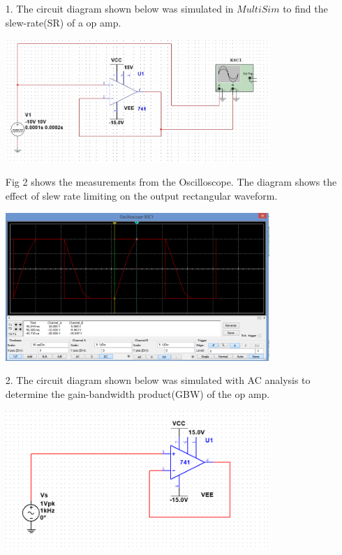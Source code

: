 \documentclass[11pt,a4paper]{article}
\begin{document}
\begin{enumerate}
  \item[1.]
  The circuit diagram shown below was simulated in $MultiSim$ to find the slew-rate(SR) of a op amp.\\
    \begin{minipage}{\linewidth}
      \centering       
       \includegraphics[width=10cm]{Task1-1Circuit}\\
    \end{minipage}
    
Fig 2 shows the measurements from the Oscilloscope. The diagram shows the effect of slew rate limiting on the output rectangular waveform.\\
    \begin{minipage}{\linewidth}
      \centering       
       \includegraphics[width=10cm]{Task1-1-Oscilloscope}\\
    \end{minipage}
  
  \item[2.]
  The circuit diagram shown below was simulated with AC analysis to determine the gain-bandwidth product(GBW) of the op amp.  
  
      \begin{minipage}{\linewidth}
      \centering
        \includegraphics[width=10cm]{Task1-2-Circuit}\\
    \end{minipage}
    

\end{enumerate}
\end{document}
